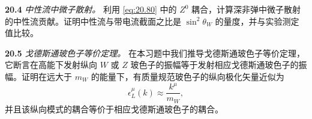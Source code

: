 \textbf{20.4} \emph{中性流中微子散射。} 利用 \eqref{eq:20.80} 中的 $Z^0$ 耦合，计算深非弹中微子散射的中性流贡献。证明中性流与带电流截面之比是 $\sin^2\theta_W$ 的量度，并与实验测定值比较。

\textbf{20.5} \emph{戈德斯通玻色子等价定理。} 在本习题中我们推导戈德斯通玻色子等价定理，它断言在高能下发射纵向 $W$ 或 $Z$ 玻色子的振幅等于发射相应戈德斯通玻色子的振幅。证明在远大于 $m_W$ 的能量下，有质量规范玻色子的纵向极化矢量近似为
\begin{equation}
  \epsilon^\mu_L(k) \approx \frac{k^\mu}{m_W} ,
\end{equation}
并且该纵向模式的耦合等价于相应戈德斯通玻色子的耦合。
